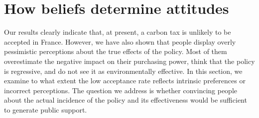 \documentclass[12pt]{article} %
\begin{document}




\section{How beliefs determine attitudes \label{sec:motives5}}

Our results clearly indicate that, at present, a carbon tax is unlikely to be accepted in France. However, we have also shown that people display overly pessimistic perceptions about the true effects of the policy. Most of them overestimate the negative impact on their purchasing power, think that the policy is regressive, and do not see it as environmentally effective. In this section, we examine to what extent the low acceptance rate reflects intrinsic preferences or incorrect perceptions. The question we address is whether convincing people about the actual incidence of the policy and its effectiveness would be sufficient to generate public support.
\end{document}
